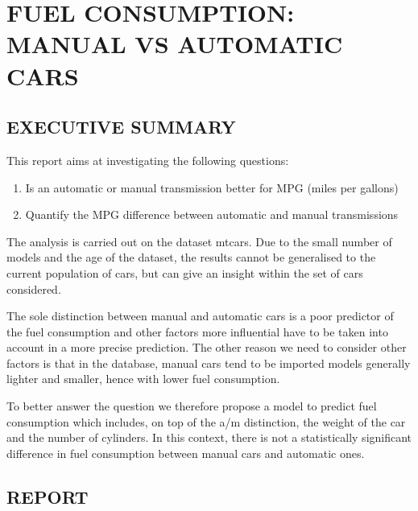 \documentclass[]{article}
\title{}
\author{}
\date{}
\begin{document}
\maketitle


\section{FUEL CONSUMPTION: MANUAL VS AUTOMATIC
CARS}\label{fuel-consumption-manual-vs-automatic-cars}

\subsection{EXECUTIVE SUMMARY}\label{executive-summary}

This report aims at investigating the following questions:

\begin{enumerate}
\def\labelenumi{\arabic{enumi}.}
\itemsep1pt\parskip0pt
\item
  Is an automatic or manual transmission better for MPG (miles per
  gallons)\\
\item
  Quantify the MPG difference between automatic and manual transmissions
\end{enumerate}

The analysis is carried out on the dataset mtcars. Due to the small
number of models and the age of the dataset, the results cannot be
generalised to the current population of cars, but can give an insight
within the set of cars considered.

The sole distinction between manual and automatic cars is a poor
predictor of the fuel consumption and other factors more influential
have to be taken into account in a more precise prediction. The other
reason we need to consider other factors is that in the database, manual
cars tend to be imported models generally lighter and smaller, hence
with lower fuel consumption.

To better answer the question we therefore propose a model to predict
fuel consumption which includes, on top of the a/m distinction, the
weight of the car and the number of cylinders. In this context, there is
not a statistically significant difference in fuel consumption between
manual cars and automatic ones.

\subsection{REPORT}\label{report}
\end{document}
